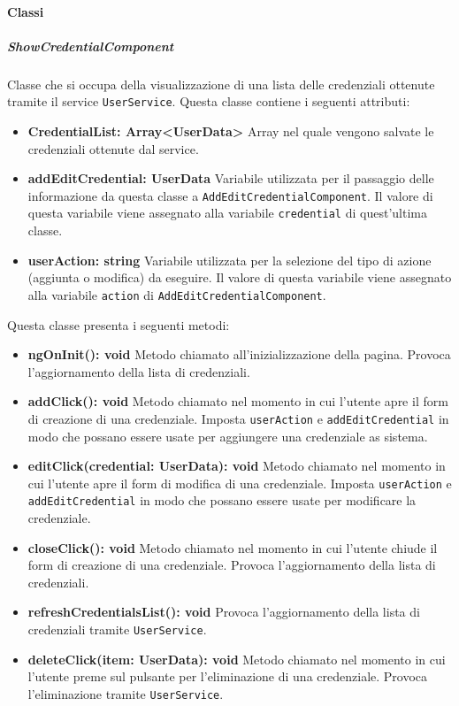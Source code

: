 \paragraph{Classi}
\subparagraph{ShowCredentialComponent}
Classe che si occupa della visualizzazione di una lista delle credenziali ottenute tramite il service \texttt{UserService}. \newline
Questa classe contiene i seguenti attributi:
\begin{itemize}
	\item \textbf{CredentialList: Array<UserData>} \newline
	Array nel quale vengono salvate le credenziali ottenute dal service.
	\item \textbf{addEditCredential: UserData} \newline
	Variabile utilizzata per il passaggio delle informazione da questa classe a \texttt{AddEditCredentialComponent}. Il valore di questa variabile viene assegnato alla variabile \texttt{credential} di quest'ultima classe.
	\item \textbf{userAction: string} \newline
	Variabile utilizzata per la selezione del tipo di azione (aggiunta o modifica) da eseguire. Il valore di questa variabile viene assegnato alla variabile \texttt{action} di \texttt{AddEditCredentialComponent}.
\end{itemize}
Questa classe presenta i seguenti metodi:
\begin{itemize}
	\item \textbf{ngOnInit(): void} \newline
	Metodo chiamato all'inizializzazione della pagina. Provoca l'aggiornamento della lista di credenziali.
	\item \textbf{addClick(): void} \newline
	Metodo chiamato nel momento in cui l'utente apre il form di creazione di una credenziale. Imposta \texttt{userAction} e \texttt{addEditCredential} in modo che possano essere usate per aggiungere una credenziale as sistema.
	\item \textbf{editClick(credential: UserData): void} \newline
	Metodo chiamato nel momento in cui l'utente apre il form di modifica di una credenziale. Imposta \texttt{userAction} e \texttt{addEditCredential} in modo che possano essere usate per modificare la credenziale.
	\item \textbf{closeClick(): void} \newline
	Metodo chiamato nel momento in cui l'utente chiude il form di creazione di una credenziale. Provoca l'aggiornamento della lista di credenziali.
	\item \textbf{refreshCredentialsList(): void} \newline
	Provoca l'aggiornamento della lista di credenziali tramite \texttt{UserService}.
	\item \textbf{deleteClick(item: UserData): void} \newline
	Metodo chiamato nel momento in cui l'utente preme sul pulsante per l'eliminazione di una credenziale. Provoca l'eliminazione tramite \texttt{UserService}.
\end{itemize}
